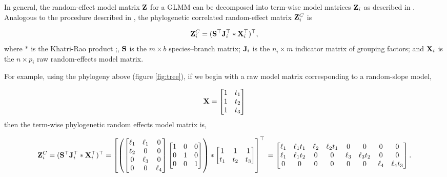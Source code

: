 \documentclass[12pt]{article}
\begin{document}
In general, the random-effect model matrix ${\mathbf Z}$ for a GLMM can be decomposed into term-wise model matrices ${\mathbf Z}_{i}$ as described in \citet{bates2015fitting}.
Analogous to the procedure described in \citet{bates2015fitting}, the phylogenetic correlated random-effect matrix ${\mathbf Z}^{C}_{i}$ is

\begin{equation}
{\mathbf Z}^{C}_{i} = ({\mathbf S}^{\top}{\mathbf J}^{\top}_{i} \ast {\mathbf X}^{\top}_{i})^{\top}, \label{eq:ZC}
\end{equation}
where $\ast$ is the Khatri-Rao product \citep{khatri1968solutions};, ${\mathbf S}$ is the $m \times b$ species--branch matrix; ${\mathbf J}_{i}$ is the $n_i \times m$ indicator matrix of grouping factors; and ${\mathbf X}_{i}$ is the $n \times p_{i}$ raw random-effects model matrix. 

For example, using the phylogeny above (figure \ref{fig:tree}), if we begin with a raw model matrix corresponding to a random-slope model, 

\[
{\mathbf X} = \begin{bmatrix}
1 & t_1  \\ 
1 & t_2  \\ 
1 & t_3 
\end{bmatrix} 
\]
then the term-wise phylogenetic random effects model matrix is,

\[
{\mathbf Z}^{C}_{i} = ({\mathbf S}^{\top}{\mathbf J}^{\top}_{i} \ast {\mathbf X}^{\top}_{i})^{\top} =
\left[
\left(
\begin{bmatrix}
\ell_{1} & \ell_{1}  & 0 \\
\ell_{2} &  0  & 0 \\
0  &  \ell_{3} & 0 \\
0 & 0 &  \ell_{4} 
\end{bmatrix}
\begin{bmatrix}
1 & 0  & 0 \\
0 & 1  & 0 \\
0 & 0  & 1  
\end{bmatrix}
\right)
\ast
\begin{bmatrix}
1   & 1   & 1  \\ 
t_1 & t_2 & t_3
\end{bmatrix} 
\right]^{\top}
\\
= \begin{bmatrix}
\ell_{1} & \ell_{1}t_1 & \ell_{2} & \ell_{2}t_1 & 0 & 0 & 0 & 0 \\
\ell_{1} & \ell_{1}t_2 & 0 & 0 & \ell_{3} & \ell_{3}t_2 & 0 & 0 \\
0 & 0 & 0 & 0 & 0 & 0 & \ell_{4} & \ell_{4}t_3
\end{bmatrix}.
\]
\end{document}
